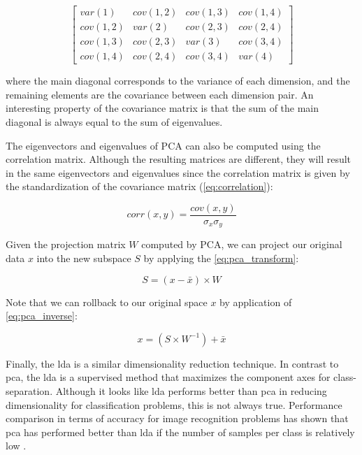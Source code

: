 $$
\begin{bmatrix}var(1) & cov(1,2) & cov(1,3) & cov(1,4) 
\\ cov(1,2) & var(2) & cov(2,3) & cov(2,4)
\\ cov(1,3) & cov(2,3) & var(3) & cov(3,4)
\\ cov(1,4) & cov(2,4) & cov(3,4) & var(4)
\end{bmatrix}
$$

\noindent
where the main diagonal corresponds to the variance of each dimension, and the remaining elements are the covariance between each dimension pair. An interesting property of the covariance matrix is that the sum of the main diagonal is always equal to the sum of eigenvalues.

The eigenvectors and eigenvalues of PCA can also be computed using the correlation matrix. Although the resulting matrices are different, they will result in the same eigenvectors and eigenvalues since the correlation matrix is given by the standardization of the covariance matrix (\autoref{eq:correlation}):

\begin{equation}
\label{eq:correlation}
corr(x,y) = \frac{cov(x,y)}{\sigma_x \sigma_y}
\end{equation}

Given the projection matrix $W$ computed by PCA, we can project our original data $x$ into the new subspace $S$ by applying the \autoref{eq:pca_transform}:

\begin{equation}
\label{eq:pca_transform}
S = (x-\bar{x}) \times W
\end{equation}

Note that we can rollback to our original space $x$ by application of \autoref{eq:pca_inverse}:

\begin{equation}
\label{eq:pca_inverse}
x = (S \times W^{-1}) + \bar{x}
\end{equation}

Finally, the \acf{lda} \citep{izenman2013linear} is a similar dimensionality reduction technique. In contrast to \acs{pca}, the \acs{lda} is a supervised method that maximizes the component axes for class-separation. Although it looks like \acs{lda} performs better than \acs{pca} in reducing dimensionality for classification problems, this is not always true. Performance comparison in terms of accuracy for image recognition problems has shown that \acs{pca} has performed better than \acs{lda} if the number of samples per class is relatively low \citep{martinez2001pca}.

